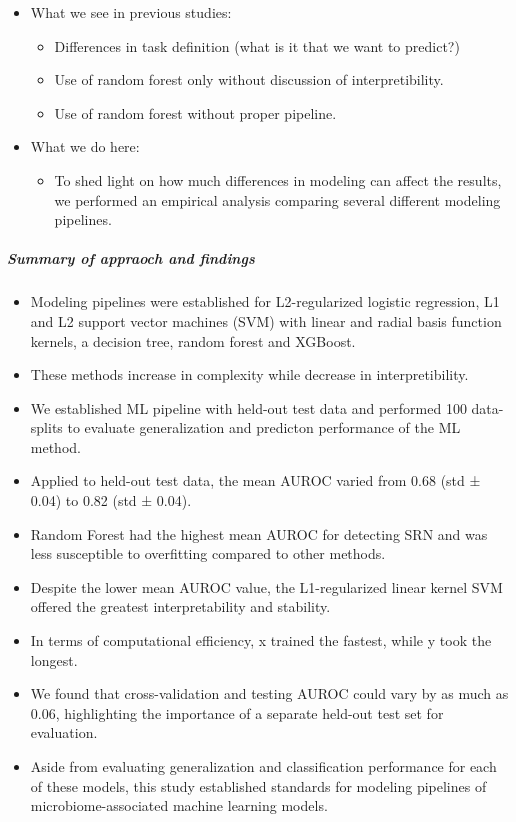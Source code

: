 \documentclass[11pt,]{article}
\providecommand{\tightlist}{%
  \setlength{\itemsep}{0pt}\setlength{\parskip}{0pt}}
\let\oldsubparagraph\subparagraph
\renewcommand{\subparagraph}[1]{\oldsubparagraph{#1}\mbox{}}
\begin{document}
\begin{itemize}
\tightlist
\item
  What we see in previous studies:

  \begin{itemize}
  \tightlist
  \item
    Differences in task definition (what is it that we want to predict?)
  \item
    Use of random forest only without discussion of interpretibility.
  \item
    Use of random forest without proper pipeline.
  \end{itemize}
\item
  What we do here:

  \begin{itemize}
  \tightlist
  \item
    To shed light on how much differences in modeling can affect the
    results, we performed an empirical analysis comparing several
    different modeling pipelines.
  \end{itemize}
\end{itemize}

\subparagraph{Summary of appraoch and
findings}\label{summary-of-appraoch-and-findings}

\begin{itemize}
\item
  Modeling pipelines were established for L2-regularized logistic
  regression, L1 and L2 support vector machines (SVM) with linear and
  radial basis function kernels, a decision tree, random forest and
  XGBoost.
\item
  These methods increase in complexity while decrease in
  interpretibility.
\item
  We established ML pipeline with held-out test data and performed 100
  data-splits to evaluate generalization and predicton performance of
  the ML method.
\item
  Applied to held-out test data, the mean AUROC varied from 0.68 (std ±
  0.04) to 0.82 (std ± 0.04).
\item
  Random Forest had the highest mean AUROC for detecting SRN and was
  less susceptible to overfitting compared to other methods.
\item
  Despite the lower mean AUROC value, the L1-regularized linear kernel
  SVM offered the greatest interpretability and stability.
\item
  In terms of computational efficiency, x trained the fastest, while y
  took the longest.
\item
  We found that cross-validation and testing AUROC could vary by as much
  as 0.06, highlighting the importance of a separate held-out test set
  for evaluation.
\item
  Aside from evaluating generalization and classification performance
  for each of these models, this study established standards for
  modeling pipelines of microbiome-associated machine learning models.
\end{itemize}
\end{document}
